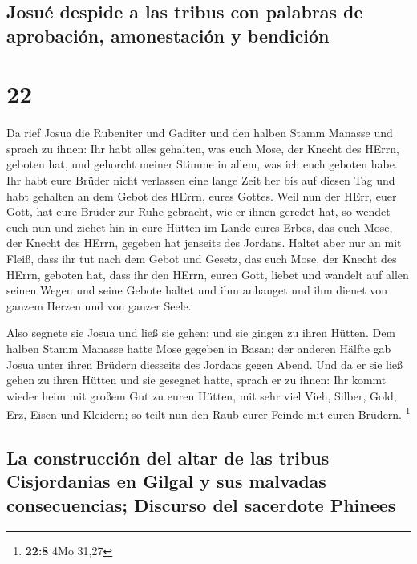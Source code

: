 \hypertarget{josuuxe9-despide-a-las-tribus-con-palabras-de-aprobaciuxf3n-amonestaciuxf3n-y-bendiciuxf3n}{%
\subsection{Josué despide a las tribus con palabras de aprobación,
amonestación y
bendición}\label{josuuxe9-despide-a-las-tribus-con-palabras-de-aprobaciuxf3n-amonestaciuxf3n-y-bendiciuxf3n}}

\hypertarget{section-21}{%
\section{22}\label{section-21}}

 Da rief Josua die Rubeniter und Gaditer und den halben
Stamm Manasse  und sprach zu ihnen: Ihr habt alles
gehalten, was euch Mose, der Knecht des HErrn, geboten hat, und gehorcht
meiner Stimme in allem, was ich euch geboten habe.  Ihr
habt eure Brüder nicht verlassen eine lange Zeit her bis auf diesen Tag
und habt gehalten an dem Gebot des HErrn, eures Gottes. 
Weil nun der HErr, euer Gott, hat eure Brüder zur Ruhe gebracht, wie er
ihnen geredet hat, so wendet euch nun und ziehet hin in eure Hütten im
Lande eures Erbes, das euch Mose, der Knecht des HErrn, gegeben hat
jenseits des Jordans.  Haltet aber nur an mit Fleiß, dass
ihr tut nach dem Gebot und Gesetz, das euch Mose, der Knecht des HErrn,
geboten hat, dass ihr den HErrn, euren Gott, liebet und wandelt auf
allen seinen Wegen und seine Gebote haltet und ihm anhanget und ihm
dienet von ganzem Herzen und von ganzer Seele.

 Also segnete sie Josua und ließ sie gehen; und sie gingen
zu ihren Hütten.  Dem halben Stamm Manasse hatte Mose
gegeben in Basan; der anderen Hälfte gab Josua unter ihren Brüdern
diesseits des Jordans gegen Abend. Und da er sie ließ gehen zu ihren
Hütten und sie gesegnet hatte,  sprach er zu ihnen: Ihr
kommt wieder heim mit großem Gut zu euren Hütten, mit sehr viel Vieh,
Silber, Gold, Erz, Eisen und Kleidern; so teilt nun den Raub eurer
Feinde mit euren Brüdern. \footnote{\textbf{22:8} 4Mo 31,27}

\hypertarget{la-construcciuxf3n-del-altar-de-las-tribus-cisjordanias-en-gilgal-y-sus-malvadas-consecuencias-discurso-del-sacerdote-phinees}{%
\subsection{La construcción del altar de las tribus Cisjordanias en
Gilgal y sus malvadas consecuencias; Discurso del sacerdote
Phinees}\label{la-construcciuxf3n-del-altar-de-las-tribus-cisjordanias-en-gilgal-y-sus-malvadas-consecuencias-discurso-del-sacerdote-phinees}}

